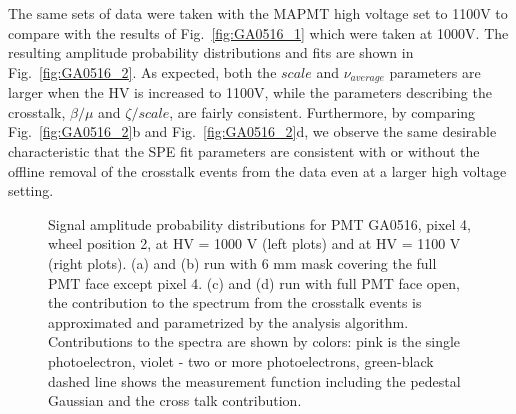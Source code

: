 The same sets of data were taken with the MAPMT high voltage set to 1100V to compare with the results of Fig.~\ref{fig:GA0516_1} which were taken at 1000V. 
The resulting amplitude probability distributions and fits are shown in Fig.~\ref{fig:GA0516_2}. 
As expected, both the $scale$ and $\nu_{average}$ parameters are larger when the HV is increased to 1100V, while the parameters describing the crosstalk, $\beta/\mu$ and $\zeta/scale$, are fairly consistent. 
Furthermore, by comparing Fig.~\ref{fig:GA0516_2}b and Fig.~\ref{fig:GA0516_2}d, we observe the same desirable characteristic that the SPE fit parameters are consistent with or without the offline removal of the crosstalk events from the data even at a larger high voltage setting.

\begin{figure}[h!bt] 
\centering 
  \caption{Signal amplitude probability distributions for PMT GA0516, pixel 4, wheel position 2, at HV = 1000 V (left plots) and at HV = 1100 V (right plots). (a) and (b) run with 6 mm mask covering the full PMT face except pixel 4. (c) and (d) run with full PMT face open, the contribution to the spectrum from the crosstalk events is approximated and parametrized by the analysis algorithm. Contributions to the spectra are shown by colors: pink is the single photoelectron, violet - two or more photoelectrons, green-black dashed line shows the measurement function including the pedestal Gaussian and the cross talk contribution. 
    }
\label{fig:GA0516_3}
\end{figure}

